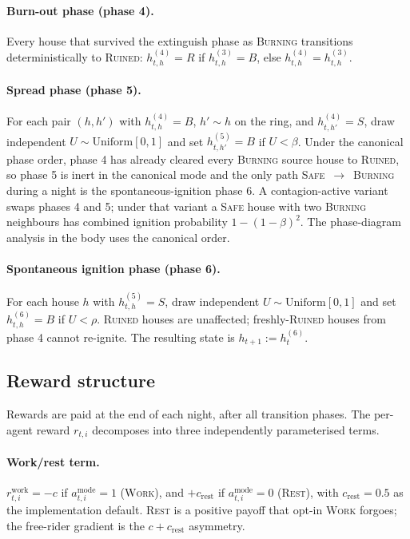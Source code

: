 \documentclass{anvil-paper}
\begin{document}
\paragraph{Burn-out phase (phase 4).}
Every house that survived the extinguish phase as \textsc{Burning}
transitions deterministically to \textsc{Ruined}:
$h_{t,h}^{(4)}=R$ if $h_{t,h}^{(3)}=B$, else $h_{t,h}^{(4)}=h_{t,h}^{(3)}$.

\paragraph{Spread phase (phase 5).}
For each pair $(h,h')$ with $h_{t,h}^{(4)}=B$, $h'\sim h$ on the ring,
and $h_{t,h'}^{(4)}=S$, draw independent $U\sim\mathrm{Uniform}[0,1]$
and set $h_{t,h'}^{(5)}=B$ if $U<\beta$. Under the canonical phase
order, phase 4 has already cleared every \textsc{Burning} source house
to \textsc{Ruined}, so phase 5 is inert in the canonical mode and the
only path \textsc{Safe}~$\to$~\textsc{Burning} during a night is the
spontaneous-ignition phase 6. A contagion-active variant swaps phases 4
and 5; under that variant a \textsc{Safe} house with two \textsc{Burning}
neighbours has combined ignition probability $1-(1-\beta)^2$. The
phase-diagram analysis in the body uses the canonical order.

\paragraph{Spontaneous ignition phase (phase 6).}
For each house $h$ with $h_{t,h}^{(5)}=S$, draw independent
$U\sim\mathrm{Uniform}[0,1]$ and set $h_{t,h}^{(6)}=B$ if $U<\rho$.
\textsc{Ruined} houses are unaffected; freshly-\textsc{Ruined} houses
from phase 4 cannot re-ignite. The resulting state is
$h_{t+1}:=h_t^{(6)}$.

\subsection{Reward structure}
\label{app:envspec:reward}

Rewards are paid at the end of each night, after all transition phases.
The per-agent reward $r_{t,i}$ decomposes into three independently
parameterised terms.

\paragraph{Work/rest term.}
$r_{t,i}^{\text{work}}=-c$ if $a_{t,i}^{\text{mode}}=1$
(\textsc{Work}), and $+c_{\text{rest}}$ if $a_{t,i}^{\text{mode}}=0$
(\textsc{Rest}), with $c_{\text{rest}}=0.5$ as the implementation
default. \textsc{Rest} is a positive payoff that opt-in \textsc{Work}
forgoes; the free-rider gradient is the $c+c_{\text{rest}}$ asymmetry.
\end{document}
